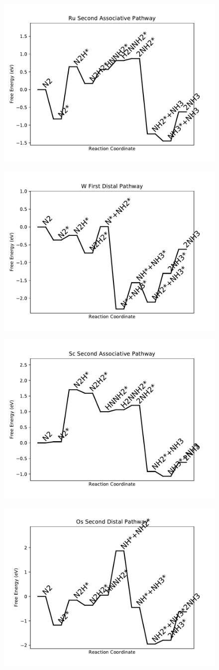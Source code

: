 \documentclass[journal=jacsat,manuscript=article]{achemso}
\begin{document}
\newpage
\begin{figure}
\includegraphics[width=0.5\linewidth]{data/plots/Ru_associative_2.pdf}
\label{fig:Ru_associative_2}
\end{figure}

\begin{figure}
\includegraphics[width=0.5\linewidth]{data/plots/W_distal_1.pdf}
\label{fig:W_distal_1}
\end{figure}

\newpage
\begin{figure}
\includegraphics[width=0.5\linewidth]{data/plots/Sc_associative_2.pdf}
\label{fig:Sc_associative_2}
\end{figure}

\begin{figure}
\includegraphics[width=0.5\linewidth]{data/plots/Os_distal_2.pdf}
\label{fig:Os_distal_2}
\end{figure}
\end{document}
